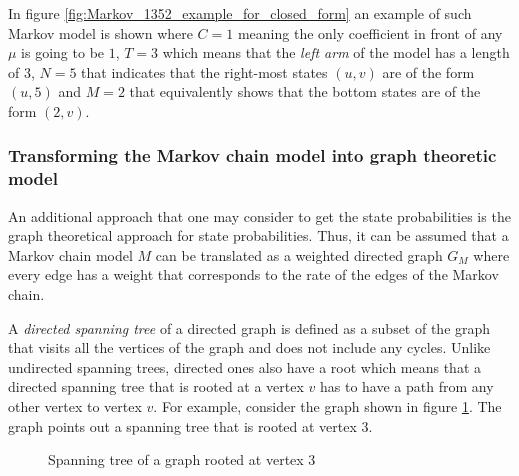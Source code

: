In figure \ref{fig:Markov_1352_example_for_closed_form} an example of such Markov model is shown where \(C=1\) meaning the only coefficient in front of any \(\mu\) is going to be \(1\), \(T=3\) which means that the \textit{left arm} of the model has a length of \(3\), \(N=5\) that indicates that the right-most states \((u,v)\) are of the form \((u,5)\) and \(M=2\) that equivalently shows that the bottom states are of the form \((2,v)\).

\subsubsection{Transforming the Markov chain model into graph theoretic model}

An additional approach that one may consider to get the state probabilities is the graph theoretical approach for state probabilities.
Thus, it can be assumed that a Markov chain model \(M\) can be translated as a weighted directed graph \(G_M\) where every edge has a weight that corresponds to the rate of the edges of the Markov chain. 

A \textit{directed spanning tree} of a directed graph is defined as a subset of the graph that visits all the vertices of the graph and does not include any cycles. 
Unlike undirected spanning trees, directed ones also have a root which means that a directed spanning tree that is rooted at a vertex \(v\) has to have a path from any other vertex to vertex \(v\). 
For example, consider the graph shown in figure \ref{fig:example_spanning_tree}. The graph points out a spanning tree that is rooted at vertex 3.


\begin{figure}[h]
    \centering
    \caption{Spanning tree of a graph rooted at vertex 3}
    \label{fig:example_spanning_tree}
\end{figure}

